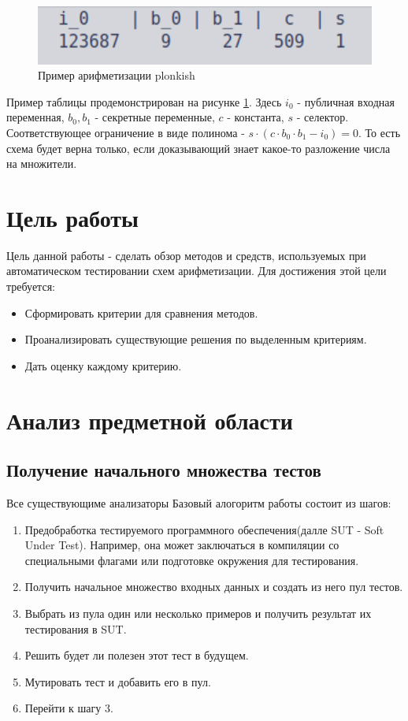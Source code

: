 \documentclass[a4paper]{article}
\begin{document}
\begin{figure}[ht!]
    \includegraphics[width=180mm]{plonkish_example.png}
    \caption{Пример арифметизации plonkish}
    \label{plonkish_example}
    \end{figure}

Пример таблицы продемонстрирован на рисунке \ref{plonkish_example}. Здесь $i_0$ - публичная входная переменная, $b_0, b_1$ - секретные переменные, $c$ - константа, $s$ - селектор. Соответствующее ограничение в виде полинома - $s \cdot (c \cdot b_0 \cdot b_1 - i_0) = 0$. То есть схема будет верна только, если доказывающий знает какое-то разложение числа на множители.

\newpage
\section{Цель работы}
\indent

Цель данной работы - сделать обзор методов и средств, используемых при автоматическом тестировании схем арифметизации. Для достижения этой цели требуется:

\begin{itemize}
\item Сформировать критерии для сравнения методов.
\item Проанализировать существующие решения по выделенным критериям.
\item Дать оценку каждому критерию.
\end{itemize}

\newpage
\section{Анализ предметной области}
\indent

\subsection{Получение начального множества тестов}
 
Все существующиме анализаторы Базовый алогоритм работы  состоит из шагов:

\begin{enumerate}
    \item Предобработка тестируемого программного обеспечения(далле SUT - Soft Under Test). Например, она может заключаться в компиляции со специальными флагами или подготовке окружения для тестирования. 
    \item Получить начальное множество входных данных и создать из него пул тестов.
    \item Выбрать из пула один или несколько примеров и получить результат их тестирования в SUT.
    \item Решить будет ли полезен этот тест в будущем.
    \item Мутировать тест и добавить его в пул.
    \item Перейти к шагу 3.
\end{enumerate}
\end{document}
